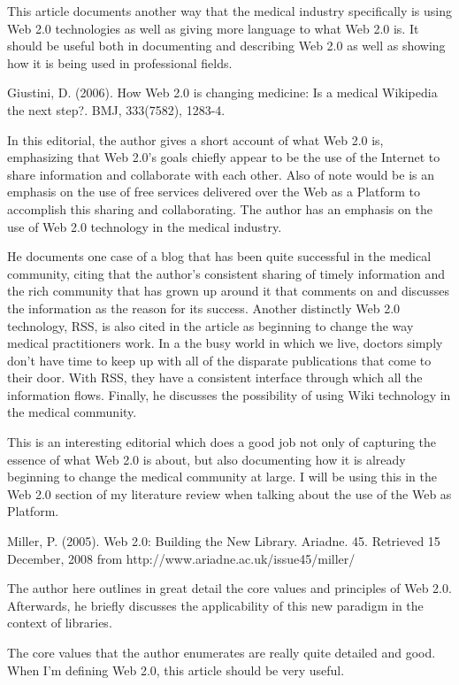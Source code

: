 \documentclass[12pt,oneside,letterpaper,titlepage]{article}
\begin{document}
This article documents another way that the medical industry specifically is
using Web 2.0 technologies as well as giving more language to what Web 2.0 is.
It should be useful both in documenting and describing Web 2.0 as well as
showing how it is being used in professional fields.

Giustini, D. (2006). How Web 2.0 is changing medicine: Is a medical Wikipedia the next step?. BMJ, 333(7582), 1283-4.

In this editorial, the author gives a short account of what Web 2.0 is,
emphasizing that Web 2.0's goals chiefly appear to be the use of the Internet to
share information and collaborate with each other.  Also of note would be is an
emphasis on the use of free services delivered over the Web as a Platform to
accomplish this sharing and collaborating.  The author has an emphasis on the
use of Web 2.0 technology in the medical industry.

He documents one case of a blog that has been quite successful in the medical
community, citing that the author's consistent sharing of timely information and
the rich community that has grown up around it that comments on and discusses
the information as the reason for its success.  Another distinctly Web 2.0
technology, RSS, is also cited in the article as beginning to change the way
medical practitioners work.  In a the busy world in which we live, doctors
simply don't have time to keep up with all of the disparate publications that
come to their door.  With RSS, they have a consistent interface through which
all the information flows.  Finally, he discusses the possibility of using Wiki
technology in the medical community.

This is an interesting editorial which does a good job not only of capturing the
essence of what Web 2.0 is about, but also documenting how it is already
beginning to change the medical community at large.  I will be using this in the
Web 2.0 section of my literature review when talking about the use of the Web as
Platform.

Miller, P. (2005). Web 2.0: Building the New Library. Ariadne. 45. Retrieved 15 December, 2008 from http://www.ariadne.ac.uk/issue45/miller/

The author here outlines in great detail the core values and principles of Web
2.0.  Afterwards, he briefly discusses the applicability of this new paradigm in
the context of libraries.

The core values that the author enumerates are really quite detailed and good.
When I'm defining Web 2.0, this article should be very useful.
\end{document}
